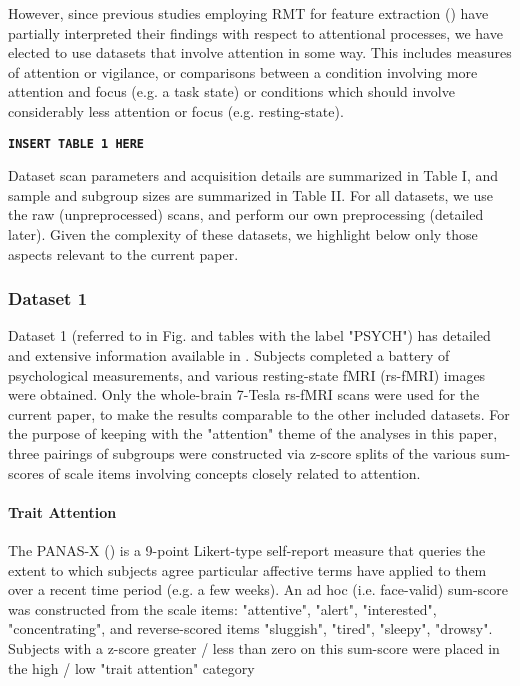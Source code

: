 However, since previous studies employing RMT for feature extraction
(\cite{wangRandomMatrixTheory2016,matharooSpontaneousBackpainAlters2020}) have partially interpreted
their findings with respect to attentional processes, we have elected to use datasets that involve
attention in some way. This includes measures of attention or vigilance, or comparisons between a
condition involving more attention and focus (e.g. a task state) or conditions which should involve
considerably less attention or focus (e.g. resting-state).

\begin{center}
\texttt{\textbf{INSERT TABLE 1 HERE}}
\end{center}

Dataset scan parameters and acquisition details are summarized in Table I, and sample and subgroup
sizes are summarized in Table II. For all datasets, we use the raw (unpreprocessed) scans, and
perform our own preprocessing (detailed later). Given the complexity of these datasets, we highlight
below only those aspects relevant to the current paper.

\subsubsection{Dataset 1}
Dataset 1 (referred to in Fig. and tables with the label "PSYCH") has detailed and extensive
information available in \cite{gorgolewskiHighResolution7Tesla2015}. Subjects completed a battery of
psychological measurements, and various resting-state fMRI (rs-fMRI) images were obtained. Only the
whole-brain 7-Tesla rs-fMRI scans were used for the current paper, to make the results comparable to
the other included datasets. For the purpose of keeping with the "attention" theme of the analyses
in this paper, three pairings of subgroups were constructed via z-score splits of the various
sum-scores of scale items involving concepts closely related to attention.

\paragraph{Trait Attention}
The PANAS-X (\cite{watsonPANASXManualPositive1994}) is a 9-point Likert-type self-report measure
that queries the extent to which subjects agree particular affective terms have applied to them over
a recent time period (e.g. a few weeks). An ad hoc (i.e. face-valid) sum-score was constructed from
the scale items: "attentive", "alert", "interested", "concentrating", and reverse-scored items
"sluggish", "tired", "sleepy", "drowsy". Subjects with a z-score greater / less than zero on this
sum-score were placed in the high / low "trait attention" category

